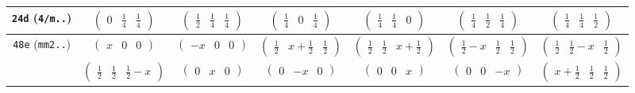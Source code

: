 \documentclass[fleqn,9pt,landscape]{jsarticle}
\begin{document}
\begin{center}
\begin{longtable}{ccccccc}
{\tt 24d} ({\tt 4/m..}) & $ \begin{pmatrix} 0 & \frac{1}{4} & \frac{1}{4} \end{pmatrix} $ & $ \begin{pmatrix} \frac{1}{2} & \frac{1}{4} & \frac{1}{4} \end{pmatrix} $ & $ \begin{pmatrix} \frac{1}{4} & 0 & \frac{1}{4} \end{pmatrix} $ & $ \begin{pmatrix} \frac{1}{4} & \frac{1}{4} & 0 \end{pmatrix} $ & $ \begin{pmatrix} \frac{1}{4} & \frac{1}{2} & \frac{1}{4} \end{pmatrix} $ & $ \begin{pmatrix} \frac{1}{4} & \frac{1}{4} & \frac{1}{2} \end{pmatrix} $ \\ \hline
{\tt 48e} ({\tt mm2..}) & $ \begin{pmatrix} x & 0 & 0 \end{pmatrix} $ & $ \begin{pmatrix} - x & 0 & 0 \end{pmatrix} $ & $ \begin{pmatrix} \frac{1}{2} & x + \frac{1}{2} & \frac{1}{2} \end{pmatrix} $ & $ \begin{pmatrix} \frac{1}{2} & \frac{1}{2} & x + \frac{1}{2} \end{pmatrix} $ & $ \begin{pmatrix} \frac{1}{2} - x & \frac{1}{2} & \frac{1}{2} \end{pmatrix} $ & $ \begin{pmatrix} \frac{1}{2} & \frac{1}{2} - x & \frac{1}{2} \end{pmatrix} $ \\
& $ \begin{pmatrix} \frac{1}{2} & \frac{1}{2} & \frac{1}{2} - x \end{pmatrix} $ & $ \begin{pmatrix} 0 & x & 0 \end{pmatrix} $ & $ \begin{pmatrix} 0 & - x & 0 \end{pmatrix} $ & $ \begin{pmatrix} 0 & 0 & x \end{pmatrix} $ & $ \begin{pmatrix} 0 & 0 & - x \end{pmatrix} $ & $ \begin{pmatrix} x + \frac{1}{2} & \frac{1}{2} & \frac{1}{2} \end{pmatrix} $ \\ \hline

\end{longtable}
\end{center}
\end{document}
